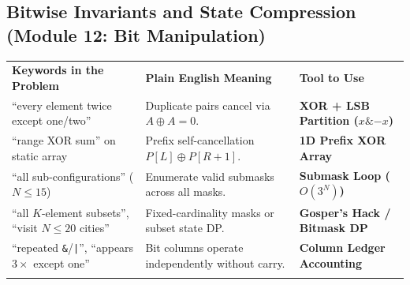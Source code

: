 \documentclass[11pt,a4paper]{article}
\begin{document}
\subsection{Bitwise Invariants and State Compression (Module 12: Bit Manipulation)}
\begingroup\footnotesize{}
\begin{tabularx}{\textwidth}{>{\raggedright\arraybackslash}p{4.4cm} >{\raggedright\arraybackslash}X >{\raggedright\arraybackslash\bfseries}p{4.0cm}}
\arrayrulecolor{primaryblue}\toprule[1.1pt]
\rowcolor{primaryblue!10}
\textcolor{primaryblue}{\textbf{Keywords in the Problem}} & \textcolor{primaryblue}{\textbf{Plain English Meaning}} & \textcolor{primaryblue}{\textbf{Tool to Use}} \\
\arrayrulecolor{codeframe}\midrule[0.6pt]
``every element twice except one/two'' & Duplicate pairs cancel via $A \oplus A = 0$. & XOR + LSB Partition ($x \mathbin{\&} -x$) \\
``range XOR sum'' on static array & Prefix self-cancellation $P[L] \oplus P[R+1]$. & 1D Prefix XOR Array \\
``all sub-configurations'' ($N \le 15$) & Enumerate valid submasks across all masks. & Submask Loop ($O(3^N)$) \\
``all $K$-element subsets'', ``visit $N \le 20$ cities'' & Fixed-cardinality masks or subset state DP. & Gosper's Hack / Bitmask DP \\
``repeated \texttt{\&}/\texttt{|}'', ``appears $3\times$ except one'' & Bit columns operate independently without carry. & Column Ledger Accounting \\
\arrayrulecolor{primaryblue}\bottomrule[1.1pt]
\end{tabularx}\endgroup
\end{document}
